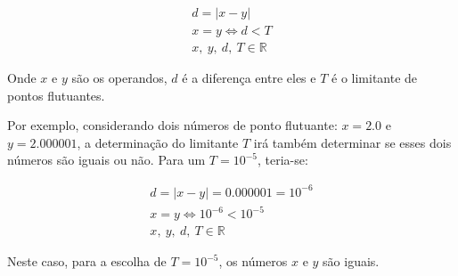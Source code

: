 \begin{equation}
    \begin{aligned}
        d = |x - y| \\
        x = y \iff d < T \\
        x,\ y,\ d,\ T \in \mathbb{R}
    \end{aligned}
\end{equation}

\vspace{.5cm}

Onde $x$ e $y$ são os operandos, $d$ é a diferença entre eles e $T$ é o limitante de 
pontos flutuantes.

Por exemplo, considerando dois números de ponto flutuante: $x = 2.0$ e $y = 2.000001$, a 
determinação do limitante $T$ irá também determinar se esses dois números são iguais ou
não. Para um $T = 10^{-5}$, teria-se:

\begin{equation}
    \begin{aligned}
        d = |x - y| = 0.000001 = 10^{-6}\\
        x = y \iff 10^{-6} < 10^{-5} \\
        x,\ y,\ d,\ T \in \mathbb{R}
    \end{aligned}
\end{equation}

\vspace{.5cm}

Neste caso, para a escolha de $T = 10^{-5}$, os números $x$ e $y$ são iguais.

